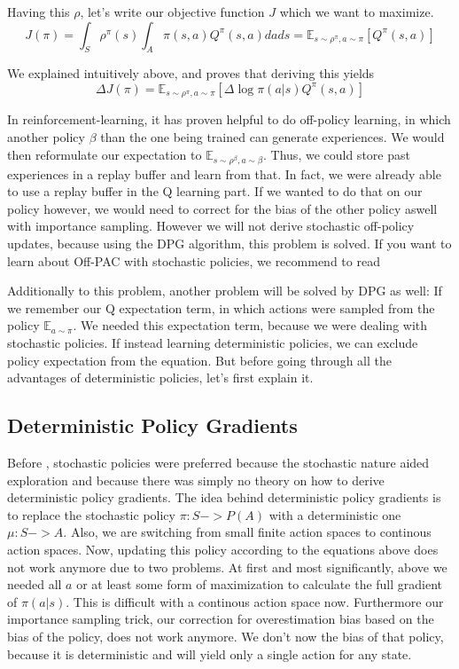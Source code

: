 \documentclass[hyperref,german,beleg]{cgvpub}
\begin{document}
Having this $\rho$, let's write our objective function $J$ which we want to maximize.
\begin{equation}
J(\pi) = \int_S \rho^{\pi}(s) \int_A \pi(s, a)Q^{\pi}(s, a) dads = \mathbb{E}_{s \sim \rho^{\pi}, a \sim \pi}[Q^{\pi}(s,a)]
\end{equation}

We explained intuitively above, and \cite{suttonPolicyGradientMethods} proves that deriving this yields
\begin{equation}
\Delta J(\pi) = \mathbb{E}_{s \sim \rho^{\pi}, a \sim \pi}[\Delta \log \pi(a|s)Q^{\pi}(s, a)]
\end{equation}


In reinforcement-learning, it has proven helpful to do off-policy learning, in which another policy $\beta$ than the one being trained can generate experiences. We would then reformulate our expectation to $\mathbb{E}_{s \sim \rho^{\beta}, a \sim \beta}$. Thus, we could store past experiences in a replay buffer and learn from that. In fact, we were already able to use a replay buffer in the Q learning part. If we wanted to do that on our policy however, we would need to correct for the bias of the other policy aswell with importance sampling. However we will not derive stochastic off-policy updates, because using the \ac{DPG} algorithm, this problem is solved. If you want to learn about \ac{Off-PAC} with stochastic policies, we recommend to read \cite{degrisOffPolicyActorCritic2013}

Additionally to this problem, another problem will be solved by \ac{DPG} as well: If we remember our Q expectation term, in which actions were sampled from the policy $\mathbb{E}_{a \sim \pi}$. We needed this expectation term, because we were dealing with stochastic policies. If instead learning deterministic policies, we can exclude policy expectation from the equation. But before going through all the advantages of deterministic policies, let's first explain it.

\subsection{Deterministic Policy Gradients}

Before \cite{silverDeterministicPolicyGradient2013}, stochastic policies were preferred because the stochastic nature aided exploration and because there was simply no theory on how to derive deterministic policy gradients. The idea behind deterministic policy gradients is to replace the stochastic policy $\pi: S -> P(A)$ with a deterministic one $\mu: S -> A$. Also, we are switching from small finite action spaces to continous action spaces. Now, updating this policy according to the equations above does not work anymore due to two problems. At first and most significantly, above we needed all $a$ or at least some form of maximization to calculate the full gradient of $\pi(a|s)$. This is difficult with a continous action space now. Furthermore our importance sampling trick, our correction for overestimation bias based on the bias of the policy, does not work anymore. We don't now the bias of that policy, because it is deterministic and will yield only a single action for any state. 
\end{document}
